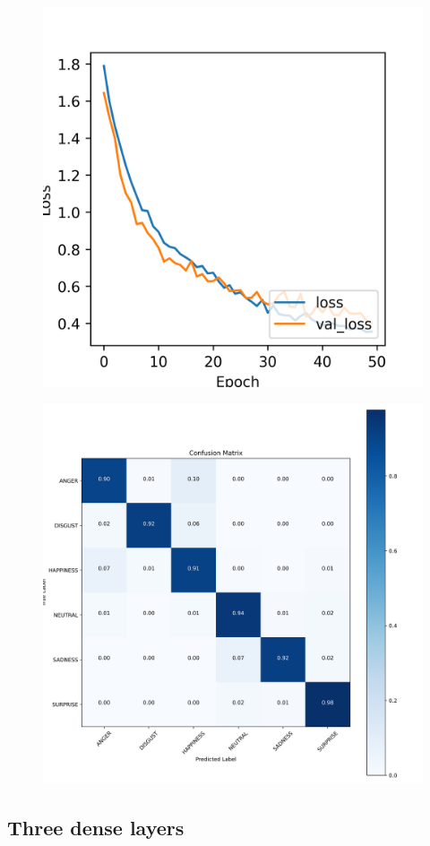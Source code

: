 \begin{figure}[H]
	\centering
	\includegraphics[width=.5\textwidth]{assets/results/preMELD.scratch/model.2dense/learning_history-loss.png}
	
	\label{fig:figure5}
\end{figure}

\begin{figure}[H]
	\centering
	\includegraphics[width=.95\textwidth]{assets/results/preMELD.scratch/model.2dense/confusion_matrix.png}
	
	\label{fig:cm2}
\end{figure}





\subsection{Three dense layers}

